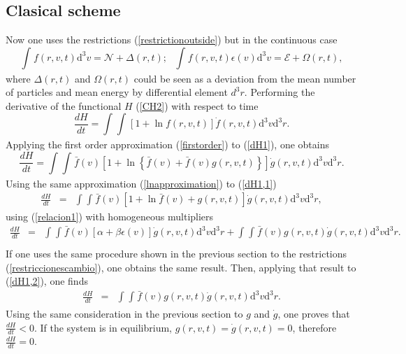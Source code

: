 \documentclass{article}
\begin{document}
\subsection{Clasical scheme}
Now one uses the restrictions (\ref{restrictionoutside}) but in the continuous case
\begin{equation}
    \int_{}^{}f(r,v,t)\mathrm{d}^3v=\mathcal{N}+\Delta(r,t); \ \ \ \int_{}^{}f(r,v,t)\epsilon(v)\mathrm{d}^3v=\mathcal{E}+\Omega(r,t)\label{restriccionescambio},
\end{equation}{}
where $\Delta(r,t)$ and $\Omega(r,t)$ could be seen as a deviation from the mean number of particles and mean energy by differential element $d^3r$.
Performing the derivative of the functional $H$ (\ref{CH2}) with respect to time
\begin{equation}
    \frac{dH}{dt}=\int_{}^{}\int_{}^{}\left[ 1+\ln f(r,v,t) \right]\dot f(r,v,t) \mathrm{d}^3v \mathrm{d}^3r \label{dH1}.
\end{equation}{}
Applying the first order approximation (\ref{firstorder}) to (\ref{dH1}), one obtains
\begin{equation}
    \frac{dH}{dt}=\int_{}^{}\int_{}^{}\bar f(v) \left [ 1+\ln \left\{ \bar f(v)+\bar f(v)g(r,v,t) \right\} \right]\dot g(r,v,t)\mathrm{d}^3v \mathrm{d}^3r \label{dH1,1}.
\end{equation}{}
Using the same approximation (\ref{lnapproximation})
to (\ref{dH1,1}) 
\begin{eqnarray}
\frac{dH}{dt}&=&\int_{}^{} \int_{}^{} \bar f(v)\left[ 1+\ln \bar f(v)+g(r,v,t) \right]\dot g(r,v,t)\mathrm{d}^3v \mathrm{d}^3r,
\end{eqnarray}{}
using (\ref{relacion1}) with homogeneous multipliers
\begin{eqnarray}
\frac{dH}{dt}&=&\int_{}^{}\int_{}^{}\bar f(v)\left[ \alpha+\beta \epsilon(v) \right]\dot g(r,v,t)\mathrm{d}^3v \mathrm{d}^3r+\int_{}^{}\int_{}^{}\bar f(v)g(r,v,t)\dot g(r,v,t)\mathrm{d}^3v \mathrm{d}^3r \label{dH1,2}. \nonumber \\
\end{eqnarray}{}
If one uses the same procedure shown in the previous section to the restrictions (\ref{restriccionescambio}), one obtains the same result. Then, applying that result to (\ref{dH1,2}), one finds
\begin{eqnarray}
\frac{dH}{dt}&=&\int_{}^{}\int_{}^{}\bar f(v)g(r,v,t)\dot g(r,v,t)\mathrm{d}^3v \mathrm{d}^3r.
\end{eqnarray}{}
Using the same consideration in the previous section to $g$ and $\dot g$, one proves that $\frac{dH}{dt}<0$. If the system is in equilibrium, $g(r,v,t)=\dot g(r,v,t)=0$, therefore $\frac{dH}{dt}=0$. 
\end{document}
